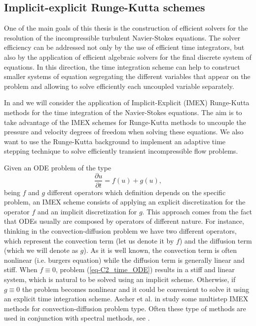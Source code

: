 \subsection{Implicit-explicit Runge-Kutta schemes}
One of the main goals of this thesis is the construction of efficient solvers for the resolution of the incompressible turbulent Navier-Stokes equations. The solver efficiency can be addressed not only by the use of efficient time integrators, but also by the application of efficient algebraic solvers for the final discrete system of equations. In this direction, the time integration scheme can help to construct smaller systems of equation segregating the different variables that appear on the problem and allowing to solve efficiently each uncoupled variable separately.

In  and  we will consider the application of Implicit-Explicit (IMEX) Runge-Kutta methods for the time integration of the Navier-Stokes equations. The aim is to take advantage of the IMEX schemes for Runge-Kutta methods to uncouple the pressure and velocity degrees of freedom when solving these equations. We also want to use the Runge-Kutta background to implement an adaptive time stepping technique to solve efficiently transient incompressible flow problems.

Given an ODE problem of the type
\begin{equation}
\label{eq-C2_time_ODE}
\frac{\partial u}{\partial t}=f(u)+g(u), 
\end{equation}
being $f$ and $g$ different operators which definition depends on the specific problem, an IMEX scheme consists of applying an explicit discretization for the operator $f$ and an implicit discretization for $g$. This approach comes from the fact that ODEs usually are composed by operators of different nature. For instance, thinking in the convection-diffusion problem we have two different operators, which represent the convection term (let us denote it by $f$) and the diffusion term (which we will denote as $g$). As it is well known, the convection term is often nonlinear (i.e. burgers equation) while the diffusion term is generally linear and stiff. When $f\equiv0$, problem (\ref{eq-C2_time_ODE}) results in a stiff and linear system, which is natural to be solved using an implicit scheme. Otherwise, if $g\equiv0$ the problem becomes nonlinear and it could be convenient to solve it using an explicit time integration scheme. Ascher et al. in \cite{ascher_implicit-explicit_1995} study some multistep IMEX methods for convection-diffusion problem type. Often these type of methods are used in conjunction with spectral methods, see \cite{canuto_spectral_1988, kim_application_1985}.

